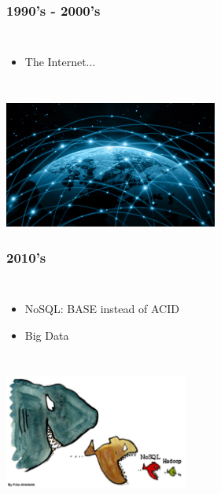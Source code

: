 \documentclass{beamer}
\begin{document}
\begin{frame}
\frametitle{1990's - 2000's}
\begin{columns}[c] 
\column{30em}
\begin{itemize}
  \justifying
  \item The Internet...
\end{itemize}
\end{columns}
\vspace{0.75cm}
\hspace*{2.5cm}\includegraphics[width=7cm]{figs/internet.pdf}
\end{frame}

\begin{frame}
\frametitle{2010's}
\begin{columns}[c] 
\column{30em}
\begin{itemize}
  \justifying
  \item NoSQL: BASE instead of ACID
  \item Big Data
\end{itemize}
\end{columns}
\vspace{0.75cm}
\hspace*{3cm}\includegraphics[width=6cm]{figs/nosql.pdf}
\end{frame}

\end{document}
